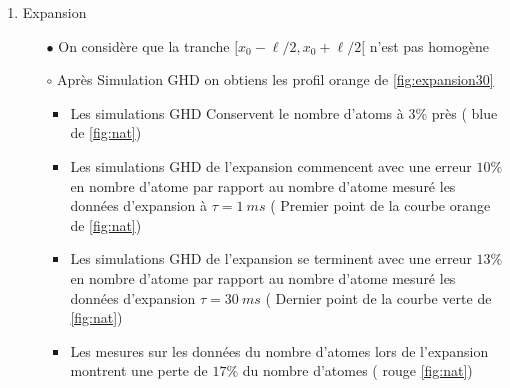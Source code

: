 \documentclass[a3, 10pt,twoside]{article}          %
\theoremstyle{plain}
\theoremstyle{definition}
\theoremstyle{remark}
\theoremstyle{definition} %
\def\OliveGreen{OliveGreen}
\begin{document}
\begin{enumerate}[label =\Alph*)]
\begin{enumerate}[label =\alph*)]
						\item Expansion 
							\begin{itemize}
								\item[$\bullet$]	 On considère que la tranche $[ x_0 - \ell/2 , x_0 + \ell/2[$ n'est pas homogène 
								\item[$\circ$] Après Simulation GHD on obtiens les profil {\color{orange} orange de \ref{fig:expansion30}}  
									\begin{itemize}
										\item Les simulations GHD Conservent le nombre d'atoms à $3\%$ près ({\color{blue} blue de \ref{fig:nat}})
										\item Les simulations GHD de l'expansion commencent avec une erreur $10\%$ en nombre d'atome par rapport au nombre d'atome mesuré les données d'expansion à $\tau = 1~ms$ ({\color{orange} Premier point de la courbe orange de \ref{fig:nat}}) 
										\item Les simulations GHD de l'expansion se terminent avec une erreur $13\%$ en nombre d'atome par rapport au nombre d'atome mesuré les données d'expansion $\tau = 30~ms$ ({\color{\OliveGreen} Dernier point de la courbe verte de \ref{fig:nat}})
										\item Les mesures sur les données du nombre d'atomes lors de l'expansion montrent une perte de $17\%$ du nombre d'atomes ({\color{red} rouge \ref{fig:nat}})
									\end{itemize}	 	
							\end{itemize}

					\end{enumerate}
			\end{enumerate}


			


	
	
	
	
\end{document}
